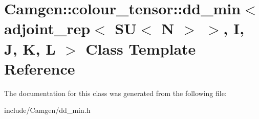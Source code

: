\hypertarget{a00120}{}\section{Camgen\+:\+:colour\+\_\+tensor\+:\+:dd\+\_\+min$<$ adjoint\+\_\+rep$<$ S\+U$<$ N $>$ $>$, I, J, K, L $>$ Class Template Reference}
\label{a00120}


The documentation for this class was generated from the following file\+:\begin{DoxyCompactItemize}
\item 
include/\+Camgen/dd\+\_\+min.\+h\end{DoxyCompactItemize}
